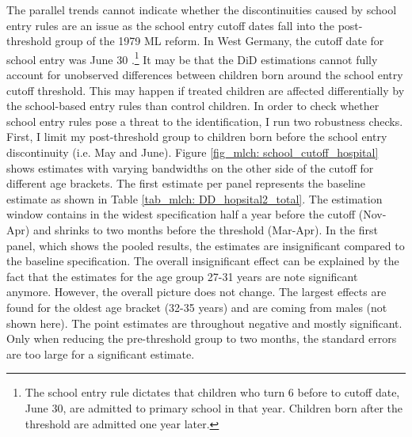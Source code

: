 The parallel trends cannot indicate whether the discontinuities caused by school entry rules are an issue as the school entry cutoff dates fall into the post-threshold group of the 1979 ML reform. In West Germany, the cutoff date for school entry was June 30 \citep{juerges2011}.\footnote{The school entry rule dictates that children who turn 6 before to cutoff date, June 30, are admitted to primary school in that year. Children born after the threshold are admitted one year later.} It may be that the DiD estimations cannot fully account for unobserved differences between children born around the school entry cutoff threshold. This may happen if treated children are affected differentially by the school-based entry rules than control children. In order to check whether school entry rules pose a threat to the identification, I run two robustness checks. First, I limit my post-threshold group to children born before the school entry discontinuity (i.e. May and June). Figure \ref{fig_mlch: school_cutoff_hospital} shows estimates with varying bandwidths on the other side of the cutoff for different age brackets. The first estimate per panel represents the baseline estimate as shown in Table \ref{tab_mlch: DD_hopsital2_total}. The estimation window contains in the widest specification half a year before the cutoff (Nov-Apr) and shrinks to two months before the threshold (Mar-Apr). In the first panel, which shows the pooled results, the estimates are insignificant compared to the baseline specification. The overall insignificant effect can be explained by the fact that the estimates for the age group 27-31 years are note significant anymore. However, the overall picture does not change. The largest effects are found for the oldest age bracket (32-35 years) {\color{red}and are coming from males (not shown here)}. The point estimates are throughout negative and mostly significant. Only when reducing the pre-threshold group to two months, the standard errors are too large for a significant estimate. 





